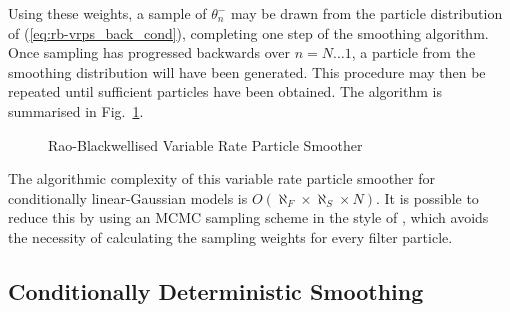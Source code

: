 \documentclass[10pt,twocolumn,twoside]{IEEEtran}
\begin{document}
Using these weights, a sample of $\theta_{n}^-$ may be drawn from the particle distribution of (\ref{eq:rb-vrps_back_cond}), completing one step of the smoothing algorithm. Once sampling has progressed backwards over $n=N \dots 1$, a particle from the smoothing distribution will have been generated. This procedure may then be repeated until sufficient particles have been obtained. The algorithm is summarised in Fig.~\ref{alg:RBVRPS}.

\begin{figure}
\caption{Rao-Blackwellised Variable Rate Particle Smoother}
\label{alg:RBVRPS}
\end{figure}

The algorithmic complexity of this variable rate particle smoother for conditionally linear-Gaussian models is $O(\aleph_F \times \aleph_S \times N)$. It is possible to reduce this by using an MCMC sampling scheme in the style of \cite{Bunch2012}, which avoids the necessity of calculating the sampling weights for every filter particle.



\subsection{Conditionally Deterministic Smoothing} \label{sec:pd-vrps}
\end{document}
